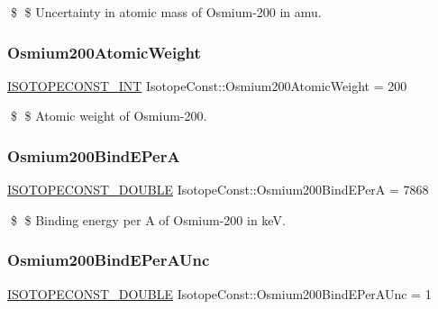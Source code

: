 \$ \$ Uncertainty in atomic mass of Osmium-\/200 in amu. \mbox{\label{group___isotope_const-_osmium-_os200_ga8698afb82302d82bbf7c76192c2ba3e5}} 
\subsubsection{\texorpdfstring{Osmium200\+Atomic\+Weight}{Osmium200AtomicWeight}}
{\footnotesize\ttfamily \mbox{\hyperlink{group___isotope_const-_macros_ga5f18360b3e99483a35c32d789e62621c}{I\+S\+O\+T\+O\+P\+E\+C\+O\+N\+S\+T\+\_\+\+I\+NT}} Isotope\+Const\+::\+Osmium200\+Atomic\+Weight = 200}

\$ \$ Atomic weight of Osmium-\/200. \mbox{\label{group___isotope_const-_osmium-_os200_ga1ae0e75ac2204bef7bb636d85d60918b}} 
\subsubsection{\texorpdfstring{Osmium200\+Bind\+E\+PerA}{Osmium200BindEPerA}}
{\footnotesize\ttfamily \mbox{\hyperlink{group___isotope_const-_macros_ga8f45a7272ce02c0b4c65c44636ed719a}{I\+S\+O\+T\+O\+P\+E\+C\+O\+N\+S\+T\+\_\+\+D\+O\+U\+B\+LE}} Isotope\+Const\+::\+Osmium200\+Bind\+E\+PerA = 7868}

\$ \$ Binding energy per A of Osmium-\/200 in keV. \mbox{\label{group___isotope_const-_osmium-_os200_ga9fc6f0bfe4c0499a457bedae76059c9d}} 
\subsubsection{\texorpdfstring{Osmium200\+Bind\+E\+Per\+A\+Unc}{Osmium200BindEPerAUnc}}
{\footnotesize\ttfamily \mbox{\hyperlink{group___isotope_const-_macros_ga8f45a7272ce02c0b4c65c44636ed719a}{I\+S\+O\+T\+O\+P\+E\+C\+O\+N\+S\+T\+\_\+\+D\+O\+U\+B\+LE}} Isotope\+Const\+::\+Osmium200\+Bind\+E\+Per\+A\+Unc = 1}

